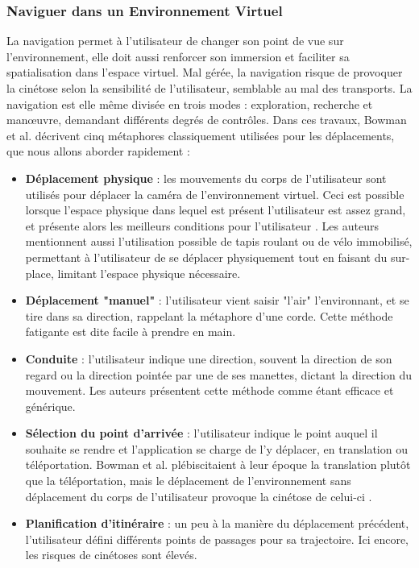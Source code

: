 	\subsubsection{Naviguer dans un Environnement Virtuel}
		La navigation permet à l'utilisateur de changer son point de vue sur l'environnement, elle doit aussi renforcer son immersion et faciliter sa spatialisation dans l'espace virtuel. Mal gérée, la navigation risque de provoquer la cinétose selon la sensibilité de l'utilisateur, semblable au mal des transports. La navigation est elle même divisée en trois modes : exploration, recherche et manœuvre, demandant différents degrés de contrôles. Dans ces travaux, Bowman et al. décrivent cinq métaphores classiquement utilisées pour les déplacements, que nous allons aborder rapidement :
		\begin{itemize}
		\item \textbf{Déplacement physique} : les mouvements du corps de l'utilisateur sont utilisés pour déplacer la caméra de l'environnement virtuel. Ceci est possible lorsque l'espace physique dans lequel est présent l'utilisateur est assez grand, et présente alors les meilleurs conditions pour l'utilisateur \cite{cherep_spatial_2020}. Les auteurs mentionnent aussi l'utilisation possible de tapis roulant ou de vélo immobilisé, permettant à l'utilisateur de se déplacer physiquement tout en faisant du sur-place, limitant l'espace physique nécessaire.
		\item \textbf{Déplacement "manuel"} : l'utilisateur vient saisir "l'air" l'environnant, et se tire dans sa direction, rappelant la métaphore d'une corde. Cette méthode fatigante est dite facile à prendre en main.
		\item \textbf{Conduite} : l'utilisateur indique une direction, souvent la direction de son regard ou la direction pointée par une de ses manettes, dictant la direction du mouvement. Les auteurs présentent cette méthode comme étant efficace et générique. 
		\item \textbf{Sélection du point d'arrivée} : l'utilisateur indique le point auquel il souhaite se rendre et l'application se charge de l'y déplacer, en translation ou téléportation. Bowman et al. plébiscitaient à leur époque la translation plutôt que la téléportation, mais le déplacement de l'environnement sans déplacement du corps de l'utilisateur provoque la cinétose de celui-ci \cite{cherep_spatial_2020}.
		\item \textbf{Planification d'itinéraire} : un peu à la manière du déplacement précédent, l'utilisateur défini différents points de passages pour sa trajectoire. Ici encore, les risques de cinétoses sont élevés.
		\end{itemize}
		
